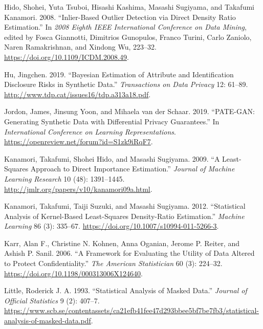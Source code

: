 \documentclass[
]{template/style/uneceart}
\newlength{\cslhangindent}
\newlength{\cslentryspacingunit} %
\newenvironment{CSLReferences}[2] %
 {%
  \setlength{\parindent}{0pt}
  \ifodd #1
  \let\oldpar\par
  \def\par{\hangindent=\cslhangindent\oldpar}
  \fi
  \setlength{\parskip}{#2\cslentryspacingunit}
 }%
 {}
\begin{document}
\begin{CSLReferences}{1}{0}
\leavevmode{}%
Hido, Shohei, Yuta Tsuboi, Hisashi Kashima, Masashi Sugiyama, and
Takafumi Kanamori. 2008. {``Inlier-Based Outlier Detection via Direct
Density Ratio Estimation.''} In \emph{2008 Eighth IEEE International
Conference on Data Mining}, edited by Fosca Giannotti, Dimitrios
Gunopulos, Franco Turini, Carlo Zaniolo, Naren Ramakrishnan, and Xindong
Wu, 223--32. \url{https://doi.org/10.1109/ICDM.2008.49}.

\leavevmode{}%
Hu, Jingchen. 2019. {``Bayesian Estimation of Attribute and
Identification Disclosure Risks in Synthetic Data.''} \emph{Transactions
on Data Privacy} 12: 61--89.
\url{http://www.tdp.cat/issues16/tdp.a313a18.pdf}.

\leavevmode{}%
Jordon, James, Jinsung Yoon, and Mihaela van der Schaar. 2019.
{``{PATE}-{GAN}: Generating Synthetic Data with Differential Privacy
Guarantees.''} In \emph{International Conference on Learning
Representations}. \url{https://openreview.net/forum?id=S1zk9iRqF7}.

\leavevmode{}%
Kanamori, Takafumi, Shohei Hido, and Masashi Sugiyama. 2009. {``A
Least-Squares Approach to Direct Importance Estimation.''} \emph{Journal
of Machine Learning Research} 10 (48): 1391--1445.
\url{http://jmlr.org/papers/v10/kanamori09a.html}.

\leavevmode{}%
Kanamori, Takafumi, Taiji Suzuki, and Masashi Sugiyama. 2012.
{``Statistical Analysis of Kernel-Based Least-Squares Density-Ratio
Estimation.''} \emph{Machine Learning} 86 (3): 335--67.
\url{https://doi.org/10.1007/s10994-011-5266-3}.

\leavevmode{}%
Karr, Alan F., Christine N. Kohnen, Anna Oganian, Jerome P. Reiter, and
Ashish P. Sanil. 2006. {``A Framework for Evaluating the Utility of Data
Altered to Protect Confidentiality.''} \emph{The American Statistician}
60 (3): 224--32. \url{https://doi.org/10.1198/000313006X124640}.

\leavevmode{}%
Little, Roderick J. A. 1993. {``Statistical Analysis of Masked Data.''}
\emph{Journal of Official Statistics} 9 (2): 407--7.
\url{https://www.scb.se/contentassets/ca21efb41fee47d293bbee5bf7be7fb3/statistical-analysis-of-masked-data.pdf}.


\end{CSLReferences}
\end{document}
